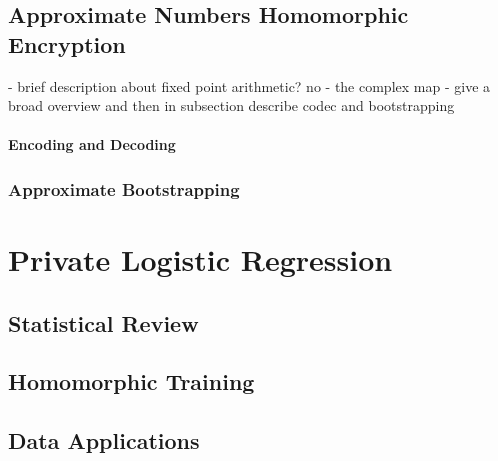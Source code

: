 

\section{Approximate Numbers Homomorphic Encryption}
\label{sec:ckks}

- brief description about fixed point arithmetic? no 
- the complex map 
- give a broad overview and then in subsection describe codec and bootstrapping

\subsubsection{Encoding and Decoding}


\subsection{Approximate Bootstrapping}

\chapter{Private Logistic Regression}
\section{Statistical Review}
\section{Homomorphic Training}
\section{Data Applications}


\label{ch:algebra}

